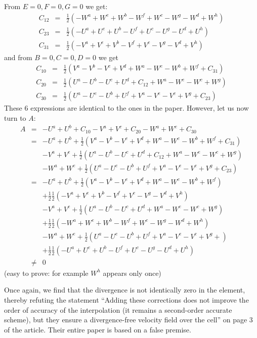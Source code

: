 From $E=0,F=0,G=0$ we get:
\begin{eqnarray}
C_{12} &=& \frac12 ( -W^a +W^e +W^b -W^f + W^c -W^g -W^d +W^h )\\
C_{23} &=& \frac12 (-U^a +U^e +U^b -U^f +U^c -U^g -U^d +U^h  ) \\
C_{31} &=& \frac12 ( -V^a +V^e +V^b -V^f +V^c -V^g -V^d + V^h )
\end{eqnarray}
and from $B=0,C=0,D=0$ we get 
\begin{eqnarray}
C_{10} &=& \frac12 ( V^a -V^b -V^c +V^d  + W^a -W^e -W^b +W^f +C_{31} ) \\
C_{20} &=& \frac12 ( U^a -U^b -U^c +U^d + C_{12} +W^a -W^e -W^c +W^g ) \\
C_{30} &=& \frac12 (U^a -U^e -U^b +U^f + V^a -V^e -V^c +V^g + C_{23} )
\end{eqnarray}
These 6 expressions are identical to the ones in the paper. 
However, let us now turn to $A$:
\begin{eqnarray}
A 
&=& -U^a + U^b  + C_{10} -V^a + V^c + C_{20} -W^a + W^e + C_{30} \\
&=& -U^a + U^b +\frac12 ( V^a -V^b -V^c +V^d  + W^a -W^e -W^b +W^f +C_{31} ) \\
&&-V^a + V^c + \frac12 ( U^a -U^b -U^c +U^d + C_{12} +W^a -W^e -W^c +W^g ) \\
&&-W^a + W^e + \frac12 (U^a -U^e -U^b +U^f + V^a -V^e -V^c +V^g + C_{23} ) \\
&=& -U^a + U^b +\frac12 ( V^a -V^b -V^c +V^d  + W^a -W^e -W^b +W^f ) \\
&&+\frac12 \frac12 ( -V^a +V^e +V^b -V^f +V^c -V^g -V^d + V^h ) \\
&&-V^a + V^c + \frac12 ( U^a -U^b -U^c +U^d  +W^a -W^e -W^c +W^g ) \\
&&+\frac12 \frac12 ( -W^a +W^e +W^b -W^f + W^c -W^g -W^d +W^h ) \\
&&-W^a + W^e + \frac12 (U^a -U^e -U^b +U^f + V^a -V^e -V^c +V^g +  ) \\ 
&& +\frac12 \frac12 (-U^a +U^e +U^b -U^f +U^c -U^g -U^d +U^h  ) \\
&\neq& 0
\end{eqnarray}
(easy to prove: for example $W^h$ appears only once)

Once again, we find that the divergence is not identically zero in the element, thereby refuting the 
statement ``Adding these corrections does not improve the order of accuracy of 
the interpolation (it remains a second-order accurate scheme), but they ensure 
a divergence-free velocity field over the cell'' on page 3 of the article. 
Their entire paper is based on a false premise.

